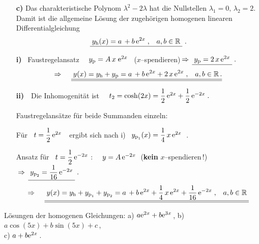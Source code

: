 {\begin{enumerate}
\item[\textbf{c)}]  Das charakteristische Polynom $\lambda^2-2\lambda$ hat die Nullstellen $\lambda_1=0,\, \lambda_2=2$. Damit ist die allgemeine L\"osung der zugeh\"origen homogenen linearen Differentialgleichung 
\[
\underline{\;y_{\text{h}}(x)=a\,+b\,\mathrm{e}^{2x}\;,\;\;\;a,b\in \mathbb{R}\;}\ . 
\]


\textbf{i)} \ Faustregelansatz \ \ $y_{\text{p}}=A\,x\;\mathrm{e}^{2x}$ \ (\glqq$x$--spendieren\grqq)$ \,\Rightarrow\,  \underline{\;y_{\text{p}} = 2\,x\,\mathrm{e}^{2x}\;}\;.$%
\[
\Rightarrow \;\;\;\;\underline{\underline{\;y(x)=y_{\text{h}}+y_{\text{p}} = 
a\,+b\,\mathrm{e}^{2x}+2\,x\,\mathrm{e}^{2x}\;,\;\;\;a,b\in \mathbb{R}\,.}} 
\]

\textbf{ii)}\ \ Die Inhomogenit\"at ist \ \ $t_{2}= \cosh(2x)=\dfrac{1}{2}\,\mathrm{e}^{2x}+\dfrac{1}{2}\,\mathrm{e}^{-2x}\;.$

Faustregelans\"atze f\"ur beide Summanden einzeln:

F\"ur \ $t=\dfrac{1}{2}\,\mathrm{e}^{2x}$\ \ ergibt sich nach i) \ \underline{\;$y_{\text{p}_{1}}(x)=\dfrac{1}{4}\,x\,\mathrm{e}^{2x}\;$}$\;.$

Ansatz f\"ur \ $t=\dfrac{1}{2}\,\mathrm{e}^{-2x}$ : \ \ $y=A\,\mathrm{e}^{-2x}\;\;$(\textbf{kein} \glqq$x$--spendieren\grqq\,!)$ \,\Rightarrow\,  \underline{\;y_{\text{p}_{2}}=\dfrac{1}{16}\,\mathrm{e}^{-2x}\;}\;.$%
\[
\Rightarrow \;\;\;\;\underline{\underline{\;y(x) = y_{\text{h}}+y_{\text{p}_{1}}+y_{\text{p}_{2}} = a\,+b\,\mathrm{e}^{2x}+\dfrac{1}{4}\,x\,\mathrm{e}^{2x}+\dfrac{1}{16}\,\mathrm{e}^{-2x}\;,\;\;\;a,b\in \mathbb{R}\;}} 
\]


\end{enumerate}
}


{
L\"osungen der homogenen Gleichungen: 
a) $a\mathrm{e}^{2x}+b\mathrm{e}^{3x}$\,,  
b) $a\cos(5x)+b\sin(5x)+c$\,,\\ 
c) $a+b\mathrm{e}^{2x}$\,.
}
